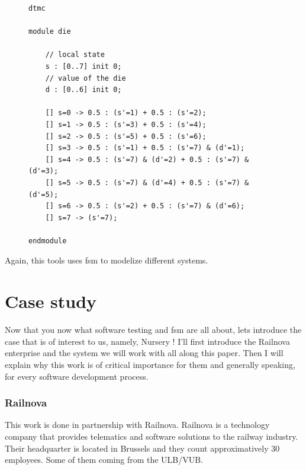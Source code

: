 \documentclass[12pt]{article}
\begin{document}
\begin{figure}
    \label{PRISM_code}
    \begin{lstlisting}[frame=single,caption="Dice model in PRISM",label={lst:PRISM_code}]
dtmc

module die

    // local state
    s : [0..7] init 0;
    // value of the die
    d : [0..6] init 0;

    [] s=0 -> 0.5 : (s'=1) + 0.5 : (s'=2);
    [] s=1 -> 0.5 : (s'=3) + 0.5 : (s'=4);
    [] s=2 -> 0.5 : (s'=5) + 0.5 : (s'=6);
    [] s=3 -> 0.5 : (s'=1) + 0.5 : (s'=7) & (d'=1);
    [] s=4 -> 0.5 : (s'=7) & (d'=2) + 0.5 : (s'=7) & (d'=3);
    [] s=5 -> 0.5 : (s'=7) & (d'=4) + 0.5 : (s'=7) & (d'=5);
    [] s=6 -> 0.5 : (s'=2) + 0.5 : (s'=7) & (d'=6);
    [] s=7 -> (s'=7);

endmodule
    \end{lstlisting}
\end{figure}

Again, this tools uses \gls{fsm} to modelize different systems.


\clearpage
\part{Case study}

Now that you now what software testing and \gls{fsm} are all about, lets introduce the case that is of interest to us, namely, Nursery ! I'll first introduce the Railnova enterprise and the system we will work with all along this paper. Then I will explain why this work is of critical importance for them and generally speaking, for every software development process.

\clearpage
\section{Railnova}

This work is done in partnership with Railnova. Railnova is a technology company that provides telematics and software solutions to the railway industry. Their headquarter is located in Brussels and they count approximatively 30 employees. Some of them coming from the ULB/VUB.\\
\end{document}
